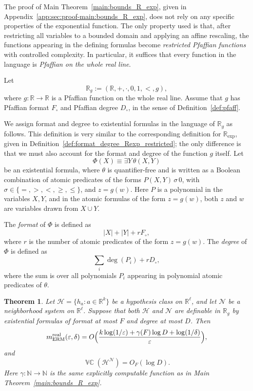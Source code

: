 \documentclass[11pt]{article}
\theoremstyle{plain}
\newtheorem{theorem}{Theorem}[section]
\theoremstyle{definition}
\theoremstyle{remark}
\DeclareMathOperator{\VCdim}{\mathbb{VC}}
\newcommand{\R}{\mathbb{R}}
\newcommand{\N}{\mathbb{N}}
\begin{document}
The proof of Main Theorem~\ref{main:bounds_R_exp}, given in
Appendix~\ref{app:sec:proof-main:bounds_R_exp}, does not rely on any
specific properties of the exponential function. The only
property used is that, after restricting all variables to a bounded
domain and applying an affine rescaling, the functions appearing in the
defining formulas become \emph{restricted Pfaffian functions} with
controlled complexity.
In particular, it suffices that every function in the language is
\emph{Pfaffian on the whole real line}. 

Let
\[
  \R_g := (\R,+,\cdot,0,1,<,g),
\]
where \(g\colon \R\to\R\) is a Pfaffian function on the whole real line.
Assume that \(g\) has Pfaffian format \(F_\circ\) and Pfaffian degree
\(D_\circ\), in the sense of Definition~\ref{def:pfaff}.

We assign format and degree to existential formulas in the language of
\(\R_g\) as follows. This definition is very similar to the corresponding definition for
\(\R_{\exp}\), given in Definition~\ref{def:format_degree_Rexp_restricted}; the only difference is that
we must also account for the format and degree of the function \(g\) itself.
Let
\[
  \Phi(X) \equiv \exists Y\,\theta(X,Y)
\]
be an existential formula, where \(\theta\) is quantifier-free and is written as
a Boolean combination of atomic predicates of the forms
\(P(X,Y)\,\sigma\,0\), with \(\sigma\in\{=,>,<,\ge,\le\}\), and \(z=g(w)\).
Here \(P\) is a polynomial in the variables \(X,Y\), and in the atomic formulas of the form \(z=g(w)\), both \(z\) and \(w\) are variables drawn from \(X \cup Y\).

The \emph{format} of \(\Phi\) is defined as
\[
  |X|+|Y|+rF_\circ,
\]
where \(r\) is the number of atomic predicates of the form \(z=g(w)\).
The \emph{degree} of \(\Phi\) is defined as
\[
  \sum_i \deg(P_i)+rD_\circ,
\]
where the sum is over all polynomials \(P_i\) appearing in polynomial atomic predicates of \(\theta\).

\begin{theorem}
\label{thm:beyond-Rexp}
Let \(\mathcal H=\{h_a:a\in\R^k\}\) be a hypothesis class on \(\R^\ell\), and let
\(\mathcal N\) be a neighborhood system on \(\R^\ell\). Suppose that both
\(\mathcal H\) and \(\mathcal N\) are definable in \(\R_g\) by existential
formulas of format at most \(F\) and degree at most \(D\). Then
\[
  m_{\mathrm{ERM}}^{\mathrm{real}}(\varepsilon,\delta)
  =
  O\Bigl(
    \frac{
      k\log(1/\varepsilon)
      + \gamma(F)\log D
      + \log(1/\delta)
    }{\varepsilon}
  \Bigr),
\]
and
\[
  \VCdim(\mathcal H^{\mathcal N})=O_F(\log D).
\]
Here \(\gamma\colon\N\to\N\) is the same explicitly computable function as in
Main Theorem~\ref{main:bounds_R_exp}.
\end{theorem}
\end{document}
